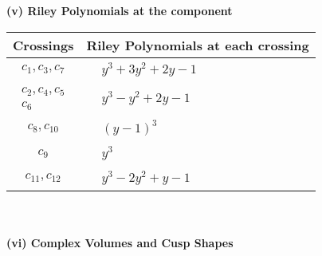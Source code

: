 \documentclass[1p]{elsarticle_modified}
\theoremstyle{definition}
\begin{document}
\newpage\renewcommand{\arraystretch}{1}
\flushleft \textbf{(v) Riley Polynomials at the component}\newline \\
\begin{tabular}{m{50pt}|m{274pt}}
Crossings & \hspace{64pt}Riley Polynomials at each crossing \\
\hline $$\begin{aligned}c_{1},c_{3},c_{7}\end{aligned}$$&$\begin{aligned}
&y^3+3 y^2+2 y-1
\end{aligned}$\\
\hline $$\begin{aligned}c_{2},c_{4},c_{5}\\c_{6}\end{aligned}$$&$\begin{aligned}
&y^3- y^2+2 y-1
\end{aligned}$\\
\hline $$\begin{aligned}c_{8},c_{10}\end{aligned}$$&$\begin{aligned}
&(y-1)^3
\end{aligned}$\\
\hline $$\begin{aligned}c_{9}\end{aligned}$$&$\begin{aligned}
&y^3
\end{aligned}$\\
\hline $$\begin{aligned}c_{11},c_{12}\end{aligned}$$&$\begin{aligned}
&y^3-2 y^2+y-1
\end{aligned}$\\
\hline
\end{tabular}\\~\\
\newpage\flushleft \textbf{(vi) Complex Volumes and Cusp Shapes}
\end{document}
